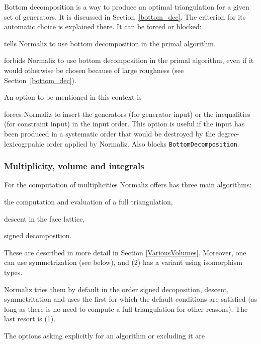 Bottom decomposition is a way to produce an optimal triangulation for a given set of generators. It is discussed in Section~\ref{bottom_dec}. The criterion for its automatic choice is explained there. It can be forced or blocked:
\begin{itemize}
	\itemtt[BottomDecomposition, -b] tells Normaliz to use bottom decomposition in the primal algorithm.
	
	\itemtt[NoBottomDec, -o] forbids Normaliz to use bottom decomposition in the primal algorithm, even if it would otherwise be chosen because of large roughness (see Section~\ref{bottom_dec}).
\end{itemize}

An option to be mentioned in this context is
\begin{itemize}
	\itemtt[KeepOrder, -k]  forces Normaliz to insert the generators (for generator input) or the inequalities (for constraint input) in the input order. This option is useful if the input has been produced in a systematic order that would be destroyed by the degree-lexicogrpahic order applied by Normaliz. Also blocks \verb|BottomDecomposition|.
\end{itemize}


\subsubsection{Multiplicity, volume and integrals}
For the computation of multiplicities Normaliz offers has three main algorithms:
\begin{arab}
	\item the computation and evaluation of a full triangulation,
	\item descent in the face lattice,
	\item signed decomposition.
\end{arab}
These are described in more detail in Section \ref{VariousVolumes}. Moreover, one can use  symmetrization (see below), and (2) has a variant using isomorphism types.

Normaliz tries them by default in the order signed decoposition, descent, symmetritation and uses the first for which the default conditions are satisfied (as long as there is no need to compute a full triangulation for other reasons). The last resort is (1).

The options asking explicitly for an algorithm  or excluding it are
\begin{itemize}
	\itemtt[Descent, -F]
	\itemtt[NoDescent]
	\itemtt[SignedDec]
	\itemtt[NoSignedDec]
\end{itemize}

